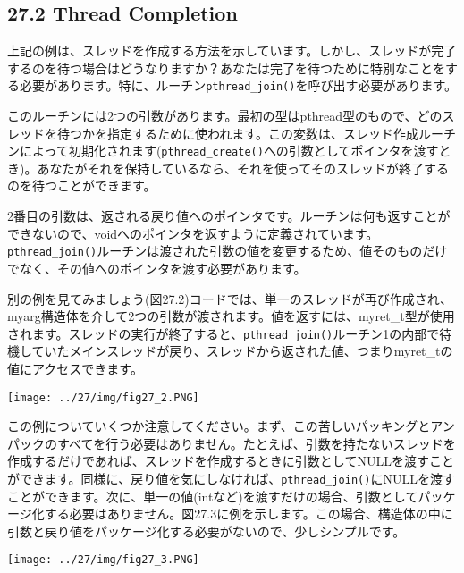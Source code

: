 \hypertarget{thread-completion}{%
\subsection*{27.2 Thread Completion}\label{thread-completion}}

上記の例は、スレッドを作成する方法を示しています。しかし、スレッドが完了するのを待つ場合はどうなりますか？あなたは完了を待つために特別なことをする必要があります。特に、ルーチン\texttt{pthread\_join()}を呼び出す必要があります。

\begin{Shaded}
\begin{Highlighting}[]
\end{Highlighting}
\end{Shaded}

このルーチンには2つの引数があります。最初の型はpthread型のもので、どのスレッドを待つかを指定するために使われます。この変数は、スレッド作成ルーチンによって初期化されます(\texttt{pthread\_create()}への引数としてポインタを渡すとき)。あなたがそれを保持しているなら、それを使ってそのスレッドが終了するのを待つことができます。

2番目の引数は、返される戻り値へのポインタです。ルーチンは何も返すことができないので、voidへのポインタを返すように定義されています。\texttt{pthread\_join()}ルーチンは渡された引数の値を変更するため、値そのものだけでなく、その値へのポインタを渡す必要があります。

別の例を見てみましょう(図27.2)コードでは、単一のスレッドが再び作成され、myarg構造体を介して2つの引数が渡されます。値を返すには、myret\_t型が使用されます。スレッドの実行が終了すると、\texttt{pthread\_join()}ルーチン1の内部で待機していたメインスレッドが戻り、スレッドから返された値、つまりmyret\_tの値にアクセスできます。

\texttt{[image: ../27/img/fig27\_2.PNG]}

この例についていくつか注意してください。まず、この苦しいパッキングとアンパックのすべてを行う必要はありません。たとえば、引数を持たないスレッドを作成するだけであれば、スレッドを作成するときに引数としてNULLを渡すことができます。同様に、戻り値を気にしなければ、\texttt{pthread\_join()}にNULLを渡すことができます。次に、単一の値(intなど)を渡すだけの場合、引数としてパッケージ化する必要はありません。図27.3に例を示します。この場合、構造体の中に引数と戻り値をパッケージ化する必要がないので、少しシンプルです。

\texttt{[image: ../27/img/fig27\_3.PNG]}

